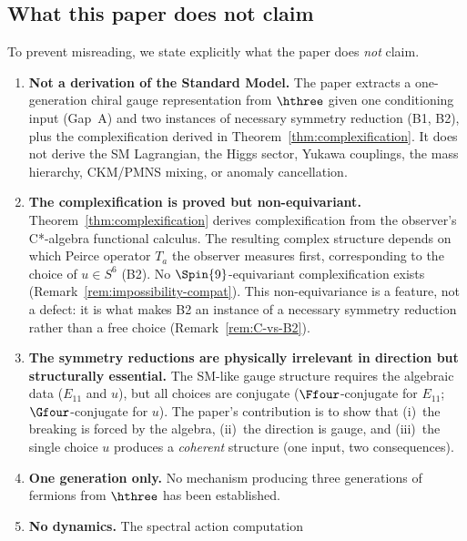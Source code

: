 \subsection{What this paper does not claim}\label{sec:not-claimed}

To prevent misreading, we state explicitly what the paper does
\emph{not} claim.

\begin{enumerate}
  \item \textbf{Not a derivation of the Standard Model.}  The paper
    extracts a one-generation chiral gauge representation from
    $\hthree$ given one conditioning input (Gap~A) and two instances
    of necessary symmetry reduction (B1, B2), plus the
    complexification derived in
    Theorem~\ref{thm:complexification}.  It does not derive the SM
    Lagrangian, the Higgs sector, Yukawa couplings, the mass
    hierarchy, CKM/PMNS mixing, or anomaly cancellation.
  \item \textbf{The complexification is proved but non-equivariant.}
    Theorem~\ref{thm:complexification} derives complexification from the
    observer's C*-algebra functional calculus.  The resulting complex
    structure depends on which Peirce operator $T_a$ the observer
    measures first, corresponding to the choice of $u \in S^6$ (B2).
    No $\Spin{9}$-equivariant complexification exists
    (Remark~\ref{rem:impossibility-compat}).  This non-equivariance
    is a feature, not a defect: it is what makes B2 an instance of
    a necessary symmetry reduction rather than a free choice
    (Remark~\ref{rem:C-vs-B2}).
  \item \textbf{The symmetry reductions are physically irrelevant in direction
    but structurally essential.}
    The SM-like gauge structure requires the algebraic data
    ($E_{11}$ and $u$), but all choices are conjugate
    ($\Ffour$-conjugate for $E_{11}$; $\Gfour$-conjugate for $u$).
    The paper's contribution is to show that (i)~the breaking is
    forced by the algebra, (ii)~the direction is gauge, and
    (iii)~the single choice $u$ produces a
    \emph{coherent} structure (one input, two consequences).
  \item \textbf{One generation only.}  No mechanism producing three
    generations of fermions from $\hthree$ has been established.
  \item \textbf{No dynamics.}  The spectral action computation

\end{enumerate}
